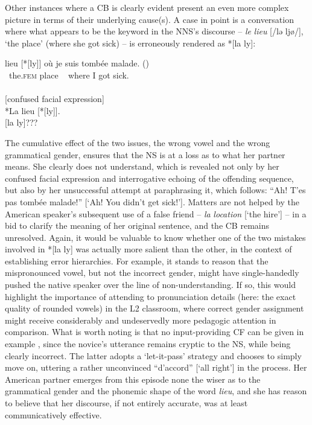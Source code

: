 \documentclass[output=paper,colorlinks,citecolor=brown,modfonts,nonflat]{../langscibook}
\begin{document}
Other instances where a CB is clearly evident present an even more complex picture in terms of their underlying cause(s). A case in point is a  conversation where what appears to be the keyword in the NNS’s discourse – \textit{le} \textit{lieu} [/lə ljø/], ‘the place’ (where she got sick) – is erroneously rendered as *[la ly]:

\ea\label{ex:scheuer:20}
{\NNS}   {lieu} [*[ly]]  {où} {je} {suis tombée} {malade.}   ()\\
            ~the.\textsc{fem}  place ~  where I got        sick. \\
            \\
{\NS} [confused facial expression] \\
{\NNS} *{La} {lieu} [*[ly]].\\
{\NS} [la ly]???\\
\z

The cumulative effect of the two issues, the wrong vowel and the wrong grammatical gender, ensures that the NS is at a loss as to what her partner means. She clearly does not understand, which is revealed not only by her confused facial expression and interrogative echoing of the offending sequence, but also by her unsuccessful attempt at paraphrasing it, which follows: “Ah! T’es pas tombée malade!” [‘Ah! You didn’t get sick!’]. Matters are not helped by the American speaker’s subsequent use of a false friend – \textit{la} \textit{location} [‘the hire’] – in a bid to clarify the meaning of her original sentence, and the CB remains unresolved. Again, it would be valuable to know whether one of the two mistakes involved in *[la ly] was actually more salient than the other, in the context of establishing error hierarchies. For example, it stands to reason that the mispronounced vowel, but not the incorrect gender, might have single-handedly pushed the native speaker over the line of non-understanding. If so, this would highlight the importance of attending to pronunciation details (here: the exact quality of rounded vowels) in the L2  classroom, where correct gender assignment might receive considerably and undeservedly more pedagogic attention in comparison. What is worth noting is that no input-providing CF can be given in example , since the novice’s utterance remains cryptic to the NS, while being clearly incorrect. The latter adopts a ‘let-it-pass’ strategy and chooses to simply move on, uttering a rather unconvinced “d’accord” [‘all right’] in the process. Her American partner emerges from this episode none the wiser as to the grammatical gender and the phonemic shape of the word \textit{lieu}, and she has reason to believe that her discourse, if not entirely accurate, was at least communicatively effective.
\end{document}
